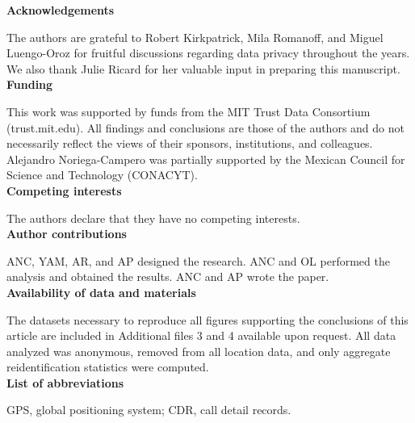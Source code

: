 \documentclass[12pt]{article}
\begin{document}
 




%




\vspace{1cm}
\noindent\textbf{Acknowledgements}

\noindent The authors are grateful to Robert Kirkpatrick, Mila Romanoff, and Miguel Luengo-Oroz for fruitful discussions regarding data privacy throughout the years. We also thank Julie Ricard for her valuable input in preparing this manuscript. \\

\noindent\textbf{Funding}

\noindent This work was supported by funds from the MIT Trust Data Consortium (trust.mit.edu). All findings and conclusions are those of the authors and do not necessarily reflect the views of their sponsors, institutions, and colleagues. Alejandro Noriega-Campero was partially supported by the Mexican Council for Science and Technology (CONACYT). \\

\noindent\textbf{Competing interests}

\noindent The authors declare that they have no competing interests. \\

\noindent\textbf{Author contributions}

\noindent ANC, YAM, AR, and AP designed the research. ANC and OL performed the analysis and obtained the results. ANC and AP wrote the paper.  \\

\noindent\textbf{Availability of data and materials}

\noindent The datasets necessary to reproduce all figures supporting the conclusions of this article are included in Additional files 3 and 4 available upon request. All data analyzed was anonymous, removed from all location data, and only aggregate reidentification statistics were computed. \\

\noindent\textbf{List of abbreviations}

\noindent GPS, global positioning system; CDR, call detail records.





\end{document}
